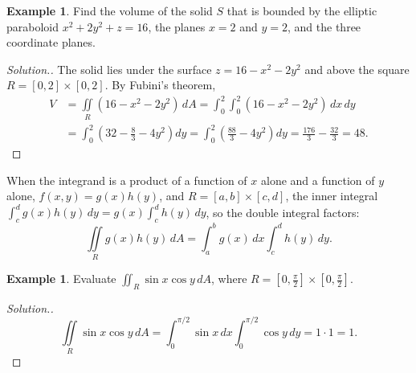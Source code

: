 \documentclass[11pt,a4paper]{article}
\theoremstyle{definition}
\newtheorem{exa}[thm]{Example}
\newenvironment{solution}
  {\renewcommand{\qedsymbol}{}\begin{proof}[\textit{Solution}.]}
  {\end{proof}}
\begin{document}
\begin{exa}
\label{ex:volumeparaboloid}
Find the volume of the solid $S$ that is bounded by the elliptic paraboloid
$x^2+ 2y^2 + z = 16$, the planes $x=2$ and $y = 2$, and the three coordinate
planes.

\begin{figure}[H]
\centering
{}
\end{figure}
\end{exa}

\begin{solution}
The solid lies under the surface $z = 16 - x^2 -2y^2$ and above the square
$R = [0,2]\times [0,2]$. By Fubini's theorem,
\begin{align*}
V & = \iint\limits_R ( 16 - x^2 - 2y^2)\, dA = \int^2_0\int^2_0 (16 - x^2 -2y^2
)\,dx\, dy\\
& = \int^2_0\left( 32 - \frac{8}{3} - 4y^2\right)dy = \int^2_0\left(
\frac{88}{3} - 4y^2\right)dy = \frac{176}{3} - \frac{32}{3} = 48 .
\end{align*}
\end{solution}

When the integrand is a product of a function of $x$ alone and a function of $y$
alone, $f(x,y) = g(x)h(y)$, and $R = [a,b]\times[c,d]$, the inner integral
$\int_c^d g(x)h(y)\,dy = g(x)\int_c^d h(y)\,dy$, so the double integral factors:
\[ \iint\limits_R g(x)h(y)\,dA = \int^b_a g(x)\,dx\int^d_c h(y)\,dy .\]

\begin{exa}
\label{ex:separable}
Evaluate $\iint_R \sin x \cos y \, dA$, where
$R = \left[ 0,\frac{\pi}{2}\right] \times \left[ 0,\frac{\pi}{2}\right]$.
\end{exa}

\begin{solution}
\[\iint\limits_R \sin x \cos y \, dA = \int^{\pi/2}_0 \sin x \, dx
\int^{\pi/2}_0\cos y \,dy = 1\cdot 1 = 1 .\]
\end{solution}
\end{document}
